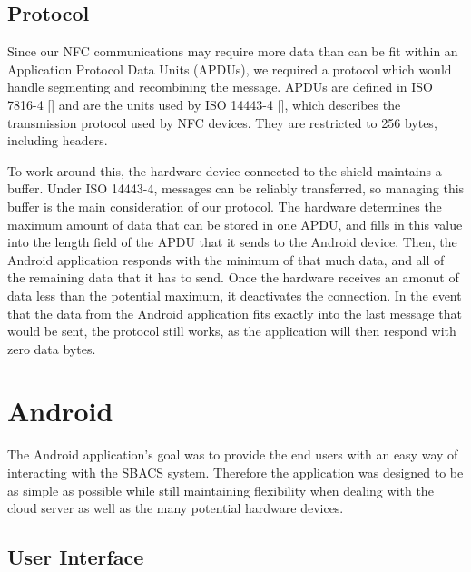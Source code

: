 \documentclass[12pt]{report}
\begin{document}

\subsection{Protocol}

Since our NFC communications may require more data than can be fit within an Application Protocol Data Units (APDUs), we
required a protocol which would handle segmenting and recombining the message. APDUs are defined in ISO 7816-4 [] and are
the units used by ISO 14443-4 [], which describes the transmission protocol used by NFC devices. They are restricted to
256 bytes, including headers.

To work around this, the hardware device connected to the shield maintains a buffer. Under ISO 14443-4, messages can be
reliably transferred, so managing this buffer is the main consideration of our protocol. The hardware determines the
maximum amount of data that can be stored in one APDU, and fills in this value into the length field of the APDU that it
sends to the Android device. Then, the Android application responds with the minimum of that much data,  and all of the
remaining data that it has to send. Once the hardware receives an amonut of data less than the potential maximum, it
deactivates the connection. In the event that the data from the Android application fits exactly into the last message
that would be sent, the protocol still works, as the application will then respond with zero data bytes.



\section{Android}

The Android application's goal was to provide the end users with an easy way of interacting with the SBACS system.
Therefore the application was designed to be as simple as possible while still maintaining flexibility when dealing with
the cloud server as well as the many potential hardware devices.


\subsection{User Interface}
\end{document}
